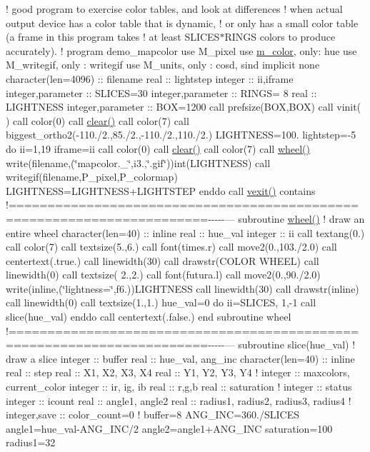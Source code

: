 ! good program to exercise color tables, and look at differences ! when actual output device has a color table that is dynamic, ! or only has a small color table (a frame in this program takes ! at least S\+L\+I\+C\+E\+S$\ast$\+R\+I\+N\+GS colors to produce accurately). ! program demo\+\_\+mapcolor use M\+\_\+pixel use \hyperlink{namespacem__color}{m\+\_\+color}, only\+: hue use M\+\_\+writegif, only \+: writegif use M\+\_\+units, only \+: cosd, sind implicit none character(len=4096) \+:\+: filename real \+:\+: lightstep integer \+:\+: ii,iframe integer,parameter \+:\+: S\+L\+I\+C\+ES=30 integer,parameter \+:\+: R\+I\+N\+GS= 8 real \+:\+: L\+I\+G\+H\+T\+N\+E\+SS integer,parameter \+:\+: B\+OX=1200 call prefsize(\+B\+O\+X,\+B\+O\+X) call vinit(\textquotesingle{} \textquotesingle{}) call color(0) call \hyperlink{namespacem__pixel_af3b81a21a0b2f6b5eddd09c031bd6173}{clear()} call color(7) call biggest\+\_\+ortho2(-\/110./2.,85./2.,-\/110./2.,110./2.) L\+I\+G\+H\+T\+N\+E\+SS=100. lightstep=-\/5 do ii=1,19 iframe=ii call color(0) call \hyperlink{namespacem__pixel_af3b81a21a0b2f6b5eddd09c031bd6173}{clear()} call color(7) call \hyperlink{huegif_8f90_afc37db6c42d2e7bb12cb85b98d9eba9b}{wheel()} write(filename,\textquotesingle{}(\char`\"{}mapcolor.\+\_\+\char`\"{},i3.,\char`\"{}.\+gif\char`\"{})\textquotesingle{})int(\+L\+I\+G\+H\+T\+N\+E\+S\+S) call writegif(filename,\+P\+\_\+pixel,\+P\+\_\+colormap) L\+I\+G\+H\+T\+N\+E\+SS=L\+I\+G\+H\+T\+N\+E\+S\+S+\+L\+I\+G\+H\+T\+S\+T\+EP enddo call \hyperlink{namespacem__pixel_a19ad6b65752322b0029a62cc0ebec3e8}{vexit()} contains !=======================================================================-\/-\/-\/-\/-\/--- subroutine \hyperlink{huegif_8f90_afc37db6c42d2e7bb12cb85b98d9eba9b}{wheel()} ! draw an entire wheel character(len=40) \+:\+: inline real \+:\+: hue\+\_\+val integer \+:\+: ii call textang(0.) call color(7) call textsize(5.,6.) call font(\textquotesingle{}times.\+r\textquotesingle{}) call move2(0.,103./2.0) call centertext(.true.) call linewidth(30) call drawstr(\textquotesingle{}C\+O\+L\+OR W\+H\+E\+EL\textquotesingle{}) call linewidth(0) call textsize( 2.,2.) call font(\textquotesingle{}futura.\+l\textquotesingle{}) call move2(0.,90./2.0) write(inline,\textquotesingle{}(\char`\"{}lightness=\char`\"{},f6.)\textquotesingle{})L\+I\+G\+H\+T\+N\+E\+SS call linewidth(30) call drawstr(inline) call linewidth(0) call textsize(1.,1.) hue\+\_\+val=0 do ii=S\+L\+I\+C\+ES, 1,-\/1 call slice(hue\+\_\+val) enddo call centertext(.false.) end subroutine wheel !=======================================================================-\/-\/-\/-\/-\/--- subroutine slice(hue\+\_\+val) ! draw a slice integer \+:\+: buffer real \+:\+: hue\+\_\+val, ang\+\_\+inc character(len=40) \+:\+: inline real \+:\+: step real \+:\+: X1, X2, X3, X4 real \+:\+: Y1, Y2, Y3, Y4 ! integer \+:\+: maxcolors, current\+\_\+color integer \+:\+: ir, ig, ib real \+:\+: r,g,b real \+:\+: saturation ! integer \+:\+: status integer \+:\+: icount real \+:\+: angle1, angle2 real \+:\+: radius1, radius2, radius3, radius4 ! integer,save \+:\+: color\+\_\+count=0 ! buffer=8 A\+N\+G\+\_\+\+I\+NC=360./\+S\+L\+I\+C\+ES angle1=hue\+\_\+val-\/\+A\+N\+G\+\_\+\+I\+N\+C/2 angle2=angle1+\+A\+N\+G\+\_\+\+I\+NC saturation=100 radius1=32 
